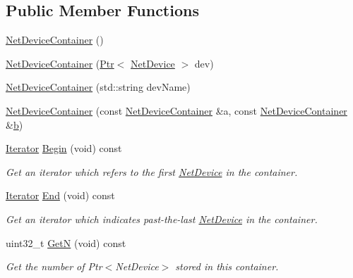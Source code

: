 \subsection*{Public Member Functions}
\begin{DoxyCompactItemize}
\item 
\hyperlink{classns3_1_1NetDeviceContainer_aff376b528dfaa1649c7ac7bdbc8d1c63}{Net\+Device\+Container} ()
\item 
\hyperlink{classns3_1_1NetDeviceContainer_a77e9f195790f01a4505ebff5d6e633df}{Net\+Device\+Container} (\hyperlink{classns3_1_1Ptr}{Ptr}$<$ \hyperlink{classns3_1_1NetDevice}{Net\+Device} $>$ dev)
\item 
\hyperlink{classns3_1_1NetDeviceContainer_ad9b75d2ba196265b5f8c4e49f9cf313a}{Net\+Device\+Container} (std\+::string dev\+Name)
\item 
\hyperlink{classns3_1_1NetDeviceContainer_a93fc6802f90ec80a43f0f517eb83cae5}{Net\+Device\+Container} (const \hyperlink{classns3_1_1NetDeviceContainer}{Net\+Device\+Container} \&a, const \hyperlink{classns3_1_1NetDeviceContainer}{Net\+Device\+Container} \&\hyperlink{lte__pathloss_8m_a21ad0bd836b90d08f4cf640b4c298e7c}{b})
\item 
\hyperlink{classns3_1_1NetDeviceContainer_a45709bb572f975569ed985fa89b132f8}{Iterator} \hyperlink{classns3_1_1NetDeviceContainer_ad5aac47677fe7277e232bdec5b48a8fc}{Begin} (void) const 
\begin{DoxyCompactList}\small\item\em Get an iterator which refers to the first \hyperlink{classns3_1_1NetDevice}{Net\+Device} in the container. \end{DoxyCompactList}\item 
\hyperlink{classns3_1_1NetDeviceContainer_a45709bb572f975569ed985fa89b132f8}{Iterator} \hyperlink{classns3_1_1NetDeviceContainer_a8af596b06daf9613da60b4379861d770}{End} (void) const 
\begin{DoxyCompactList}\small\item\em Get an iterator which indicates past-\/the-\/last \hyperlink{classns3_1_1NetDevice}{Net\+Device} in the container. \end{DoxyCompactList}\item 
uint32\+\_\+t \hyperlink{classns3_1_1NetDeviceContainer_a74cafc212479bc38976bebd118e856b9}{GetN} (void) const 
\begin{DoxyCompactList}\small\item\em Get the number of Ptr$<$\+Net\+Device$>$ stored in this container. \end{DoxyCompactList}\item 

\end{DoxyCompactItemize}
